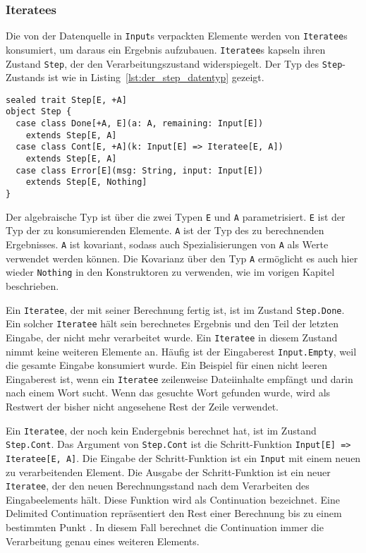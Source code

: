 \documentclass[draft=false
              ,paper=a4
              ,twoside=false
              ,fontsize=11pt
              ,headsepline
              ,BCOR10mm
              ,DIV11
              ]{scrbook}
\begin{document}


\subsubsection{Iteratees} %
\label{ssub:design_iteratees}

Die von der Datenquelle in \lstinline|Input|s verpackten Elemente werden von \lstinline|Iteratee|s konsumiert, um daraus ein Ergebnis aufzubauen.
\lstinline|Iteratee|s kapseln ihren Zustand \lstinline|Step|, der den Verarbeitungszustand widerspiegelt.
Der Typ des \lstinline|Step|-Zustands ist wie in Listing~\ref{lst:der_step_datentyp} gezeigt.
\begin{lstlisting}[caption=Der Step-Datentyp, label=lst:der_step_datentyp]
sealed trait Step[E, +A]
object Step {
  case class Done[+A, E](a: A, remaining: Input[E])
    extends Step[E, A]
  case class Cont[E, +A](k: Input[E] => Iteratee[E, A])
    extends Step[E, A]
  case class Error[E](msg: String, input: Input[E])
    extends Step[E, Nothing]
}
\end{lstlisting}

Der algebraische Typ ist über die zwei Typen \lstinline|E| und \lstinline|A| parametrisiert.
\lstinline|E| ist der Typ der zu konsumierenden Elemente.
\lstinline|A| ist der Typ des zu berechnenden Ergebnisses.
\lstinline|A| ist kovariant, sodass auch Spezialisierungen von \lstinline|A| als Werte verwendet werden können.
Die Kovarianz über den Typ \lstinline|A| ermöglicht es auch hier wieder \lstinline|Nothing| in den Konstruktoren zu verwenden, wie im vorigen Kapitel beschrieben.

Ein \lstinline|Iteratee|, der mit seiner Berechnung fertig ist, ist im Zustand \lstinline|Step.Done|.
Ein solcher \lstinline|Iteratee| hält sein berechnetes Ergebnis und den Teil der letzten Eingabe, der nicht mehr verarbeitet wurde.
Ein \lstinline|Iteratee| in diesem Zustand nimmt keine weiteren Elemente an.
Häufig ist der Eingaberest \lstinline|Input.Empty|, weil die gesamte Eingabe konsumiert wurde.
Ein Beispiel für einen nicht leeren Eingaberest ist, wenn ein \lstinline|Iteratee| zeilenweise Dateiinhalte empfängt und darin nach einem Wort sucht.
Wenn das gesuchte Wort gefunden wurde, wird als Restwert der bisher nicht angesehene Rest der Zeile verwendet.

Ein \lstinline|Iteratee|, der noch kein Endergebnis berechnet hat, ist im Zustand \lstinline|Step.Cont|.
Das Argument von \lstinline|Step.Cont| ist die Schritt-Funktion \lstinline[breaklines=true]|Input[E] => Iteratee[E, A]|.
Die Eingabe der Schritt-Funktion ist ein \lstinline|Input| mit einem neuen zu verarbeitenden Element.
Die Ausgabe der Schritt-Funktion ist ein neuer \lstinline|Iteratee|, der den neuen Berechnungsstand nach dem Verarbeiten des Eingabeelements hält.
Diese Funktion wird als Continuation bezeichnet.
Eine Delimited Continuation repräsentiert den Rest einer Berechnung bis zu einem bestimmten Punkt \cite[vgl.][S.~1]{continuations}.
In diesem Fall berechnet die Continuation immer die Verarbeitung genau eines weiteren Elements.
\end{document}
